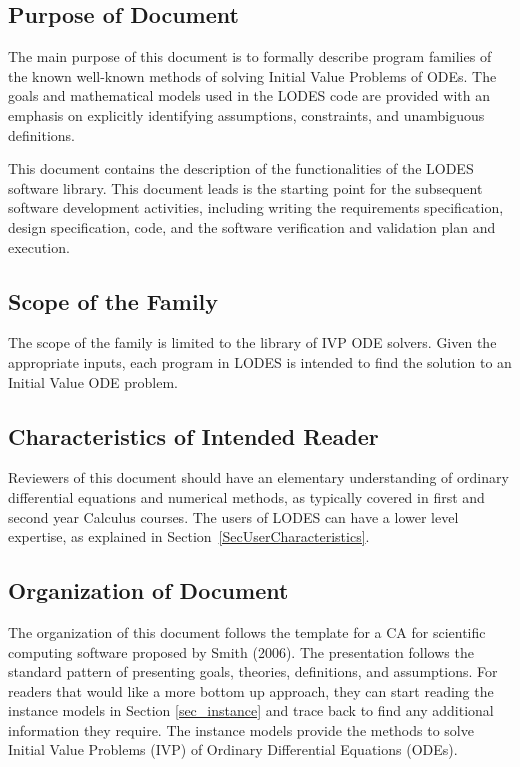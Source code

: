 \documentclass[12pt]{article}
\newcommand{\famname}{LODES} %
\begin{document}
\subsection{Purpose of Document}
The main purpose of this document is to formally describe program families of
the known well-known methods of solving Initial Value Problems of ODEs.
The goals and mathematical models used in the \famname{} code are provided with
an emphasis on explicitly identifying assumptions, constraints, and unambiguous definitions.

This document contains the description of the functionalities of the \famname{} software
library. This document leads is the starting point for the subsequent software development
activities, including writing the requirements specification, design specification, code, and
the software verification and validation plan and execution.

\subsection{Scope of the Family}
The scope of the family is limited to the library of IVP ODE solvers. Given
the appropriate inputs, each program in \famname{} is intended to find the solution to an
Initial Value ODE problem.

\subsection{Characteristics of Intended Reader}
Reviewers of this document should have an elementary understanding of ordinary differential
equations and numerical methods, as typically covered in first and second year Calculus courses.
The users of \famname{} can have a lower level expertise, as explained in
Section~\ref{SecUserCharacteristics}.

\subsection{Organization of Document}
The organization of this document follows the template for a CA for scientific
computing software proposed by Smith (2006). The presentation follows the standard
pattern of presenting goals, theories, definitions, and assumptions. For readers that would
like a more bottom up approach, they can start reading the instance models in Section
\ref{sec_instance} and trace back to find any additional information they require.  The
instance models provide the methods to solve Initial Value Problems (IVP) of Ordinary Differential Equations (ODEs).
\end{document}
